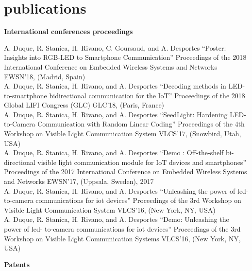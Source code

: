 \documentclass[]{cv-style}          %
\begin{document}
\section{publications}
 \vspace{-0.2cm}
\large{\textbf{International conferences proceedings}}

\normalsize
\begin{publist}
\pub
{A. Duque, R. Stanica, H. Rivano, C. Goursaud, and A. Desportes}
{“Poster: Insights into RGB-LED to Smartphone Communication”}
{Proceedings of the 2018 International Conference on Embedded Wireless Systems and Networks}
{EWSN’18, (Madrid, Spain)}\\
\pub
{A. Duque, R. Stanica, H. Rivano, and A. Desportes}
{“Decoding methods in LED-to-smartphone bidirectional communication for the IoT”}
{Proceedings of the 2018 Global LIFI Congress (GLC)}
{GLC’18, (Paris, France)}\\
\pub
{A. Duque, R. Stanica, H. Rivano, and A. Desportes}
{“SeedLight: Hardening LED-to-Camera Communication with Random Linear Coding”}
{Proceedings of the 4th Workshop on Visible Light Communication System}
{VLCS’17, (Snowbird, Utah, USA)}\\
\pub
{A. Duque, R. Stanica, H. Rivano, and A. Desportes}
{“Demo : Off-the-shelf bi-directional visible light communication module for IoT devices and smartphones”}
{Proceedings of the 2017 International Conference on Embedded Wireless Systems and Networks}
{EWSN’17, (Uppsala, Sweden), 2017}\\
\pub
  {A. Duque, R. Stanica, H. Rivano, and A. Desportes}
  {“Unleashing the power of led- to-camera communications for iot devices”}
  {Proceedings of the 3rd Workshop on Visible Light Communication System}
  {VLCS’16, (New York, NY, USA)}\\
\pub
  {A. Duque, R. Stanica, H. Rivano, and A. Desportes} {“Demo: Unleashing the power of led- to-camera communications for iot devices”} {Proceedings of the 3rd Workshop on Visible Light Communication Systems} {VLCS’16, (New York, NY, USA)}

\end{publist}


\large{\textbf{Patents}}
\end{document}
